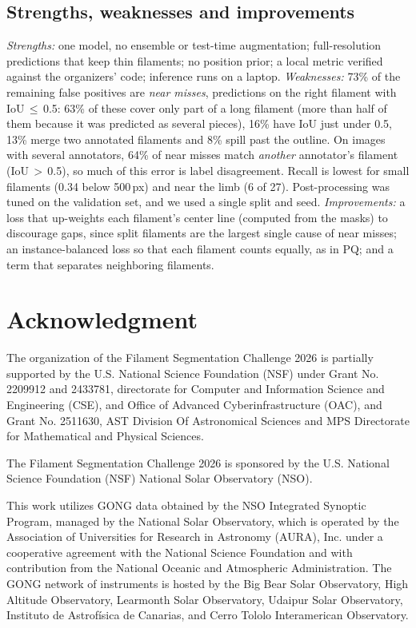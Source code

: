 \documentclass[sigconf]{acmart}
\begin{document}
\subsection{Strengths, weaknesses and improvements}
    \emph{Strengths:} one model, no ensemble or test-time augmentation; full-resolution predictions that keep thin filaments; no position prior; a local metric verified against the organizers' code; inference runs on a laptop. \emph{Weaknesses:} 73\% of the remaining false positives are \emph{near misses}, predictions on the right filament with IoU\,$\leq$\,0.5: 63\% of these cover only part of a long filament (more than half of them because it was predicted as several pieces), 16\% have IoU just under 0.5, 13\% merge two annotated filaments and 8\% spill past the outline. On images with several annotators, 64\% of near misses match \emph{another} annotator's filament (IoU\,$>$\,0.5), so much of this error is label disagreement. Recall is lowest for small filaments (0.34 below 500\,px) and near the limb (6 of 27). Post-processing was tuned on the validation set, and we used a single split and seed. \emph{Improvements:} a loss that up-weights each filament's center line (computed from the masks) to discourage gaps, since split filaments are the largest single cause of near misses; an instance-balanced loss so that each filament counts equally, as in PQ; and a term that separates neighboring filaments.


\section{Acknowledgment}\label{sec:acknowledgment}
    The organization of the Filament Segmentation Challenge 2026 is partially supported by the U.S. National Science Foundation (NSF) under Grant No. 2209912 and 2433781, directorate for Computer and Information Science and Engineering (CSE), and Office of Advanced Cyberinfrastructure (OAC), and Grant No. 2511630, AST Division Of Astronomical Sciences and MPS Directorate for Mathematical and Physical Sciences.

    The Filament Segmentation Challenge 2026 is sponsored by the U.S. National Science Foundation (NSF) National Solar Observatory (NSO). 

    This work utilizes GONG data obtained by the NSO Integrated Synoptic Program, managed by the National Solar Observatory, which is operated by the Association of Universities for Research in Astronomy (AURA), Inc. under a cooperative agreement with the National Science Foundation and with contribution from the National Oceanic and Atmospheric Administration. The GONG network of instruments is hosted by the Big Bear Solar Observatory, High Altitude Observatory, Learmonth Solar Observatory, Udaipur Solar Observatory, Instituto de Astrofísica de Canarias, and Cerro Tololo Interamerican Observatory.



\end{document}
